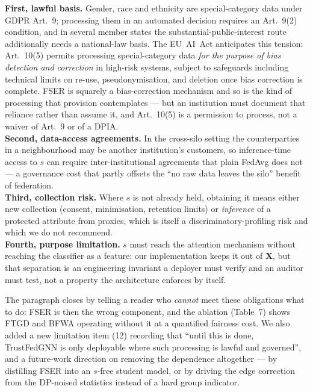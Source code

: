 \documentclass[11pt,a4paper]{article}
\newenvironment{newtextbox}
  {\begin{mdframed}[linecolor=newtext!45,linewidth=0.8pt,skipabove=6pt,
    skipbelow=8pt,innertopmargin=6pt,innerbottommargin=6pt]\small}
  {\end{mdframed}}
\begin{document}
\begin{newtextbox}
\textbf{First, lawful basis.} Gender, race and ethnicity are special-category
data under GDPR Art.~9; processing them in an automated decision requires an
Art.~9(2) condition, and in several member states the substantial-public-interest
route additionally needs a national-law basis. The EU~AI~Act anticipates this
tension: Art.~10(5) permits processing special-category data \emph{for the
purpose of bias detection and correction} in high-risk systems, subject to
safeguards including technical limits on re-use, pseudonymisation, and deletion
once bias correction is complete. FSER is squarely a bias-correction mechanism
and so is the kind of processing that provision contemplates --- but an
institution must document that reliance rather than assume it, and Art.~10(5) is
a permission to process, not a waiver of Art.~9 or of a DPIA.\\[0.35em]
\textbf{Second, data-access agreements.} In the cross-silo setting the
counterparties in a neighbourhood may be another institution's customers, so
inference-time access to $s$ can require inter-institutional agreements that
plain FedAvg does not --- a governance cost that partly offsets the ``no raw data
leaves the silo'' benefit of federation.\\[0.35em]
\textbf{Third, collection risk.} Where $s$ is not already held, obtaining it
means either new collection (consent, minimisation, retention limits) or
\emph{inference} of a protected attribute from proxies, which is itself a
discriminatory-profiling risk and which we do not recommend.\\[0.35em]
\textbf{Fourth, purpose limitation.} $s$ must reach the attention mechanism
without reaching the classifier as a feature: our implementation keeps it out of
$\mathbf{X}$, but that separation is an engineering invariant a deployer must
verify and an auditor must test, not a property the architecture enforces by
itself.
\end{newtextbox}

The paragraph closes by telling a reader who \emph{cannot} meet these
obligations what to do: FSER is then the wrong component, and the ablation
(Table~7) shows FTGD and BFWA operating without it at a quantified fairness cost.
We also added a new limitation item (12) recording that ``until this is done,
TrustFedGNN is only deployable where such processing is lawful and governed'',
and a future-work direction on removing the dependence altogether --- by
distilling FSER into an $s$-free student model, or by driving the edge correction
from the DP-noised statistics instead of a hard group indicator.
\end{document}
